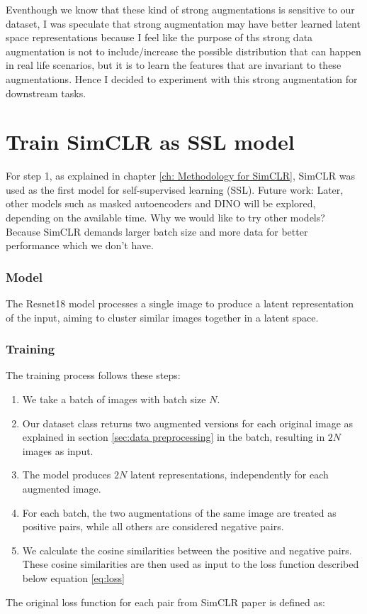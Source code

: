  Eventhough we know that these kind of strong augmentations is sensitive to our dataset, I was speculate that strong augmentation may
 have better learned latent space representations because I feel like the purpose of ths strong data augmentation is not to include/increase 
 the possible distribution that can happen in real life scenarios, but it is to learn the features that are invariant to these augmentations.
Hence I decided to experiment with this strong augmentation for downstream tasks.
\section{Train SimCLR as SSL model}
For step 1, as explained in chapter \ref{ch: Methodology for SimCLR}, SimCLR was used as the first model for self-supervised learning (SSL). 
Future work: Later, other models such as masked autoencoders and DINO will be explored, depending on the available time.
Why we would like to try other models? Because SimCLR demands larger batch size and more data for better performance which we don't have.



\subsubsection{Model}
The Resnet18 \cite{he2015deepresiduallearningimage} model processes a single image to produce a latent representation of the input, aiming to cluster 
similar images together in a latent space. 

\subsubsection{Training }
The training process follows these steps:

\begin{enumerate}
    \item We take a batch of images with batch size $N$.
    
    \item Our dataset class returns two augmented versions for each original image as explained in section \ref{sec:data preprocessing} in the batch, 
    resulting in $2N$ images as input.

    \item The model produces $2N$ latent representations, independently for each augmented image.

    \item For each batch, the two augmentations of the same image are treated as positive pairs, while all others are considered negative pairs.

    \item We calculate the cosine similarities between the positive and negative pairs. These cosine similarities are then used as input to the loss
     function described below equation \ref{eq:loss}
\end{enumerate}
The original loss function for each pair from SimCLR paper \cite{chen2020simple} is defined as:

